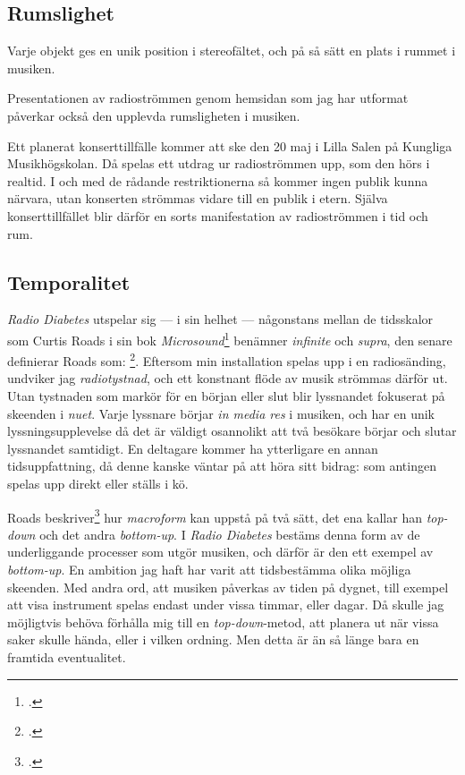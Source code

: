 \documentclass[11pt, a4paper]{article} %
\begin{document}
\subsection*{Rumslighet}
Varje objekt ges en unik position i stereofältet, och på så sätt en plats i rummet i musiken. 

Presentationen av radioströmmen genom hemsidan som jag har utformat påverkar också den upplevda rumsligheten i musiken. 

Ett planerat konserttillfälle kommer att ske den 20 maj i Lilla Salen på Kungliga Musikhögskolan. Då spelas ett utdrag ur radioströmmen upp, som den hörs i realtid. I och med de rådande restriktionerna så kommer ingen publik kunna närvara, utan konserten strömmas vidare till en publik i etern. Själva konserttillfället blir därför en sorts manifestation av radioströmmen i tid och rum. 



\subsection*{Temporalitet}
\emph{Radio Diabetes} utspelar sig --- i sin helhet --- någonstans mellan de tidsskalor som Curtis Roads i sin bok \emph{Microsound}\footcite{roads_microsound_2004} benämner \emph{infinite} och \emph{supra}, den senare definierar Roads som: \footcite[3]{roads_microsound_2004}. Eftersom min installation spelas upp i en radiosänding, undviker jag \emph{radiotystnad}, och ett konstnant flöde av musik strömmas därför ut. Utan tystnaden som markör för en början eller slut blir lyssnandet fokuserat på skeenden i \emph{nuet}. Varje lyssnare börjar \emph{in media res} i musiken, och har en unik lyssningsupplevelse då det är väldigt osannolikt att två besökare börjar och slutar lyssnandet samtidigt. En deltagare kommer ha ytterligare en annan tidsuppfattning, då denne kanske väntar på att höra sitt bidrag: som antingen spelas upp direkt eller ställs i kö.

Roads beskriver\footcite[13]{roads_microsound_2004} hur \emph{macroform} kan uppstå på två sätt, det ena kallar han \emph{top-down} och det andra \emph{bottom-up}. I \emph{Radio Diabetes} bestäms denna form av de underliggande processer som utgör musiken, och därför är den ett exempel av \emph{bottom-up}. En ambition jag haft har varit att tidsbestämma olika möjliga skeenden. Med andra ord, att musiken påverkas av tiden på dygnet, till exempel att visa instrument spelas endast under vissa timmar, eller dagar. Då skulle jag möjligtvis behöva förhålla mig till en \emph{top-down}-metod, att planera ut när vissa saker skulle hända, eller i vilken ordning. Men detta är än så länge bara en framtida eventualitet.
\end{document}
